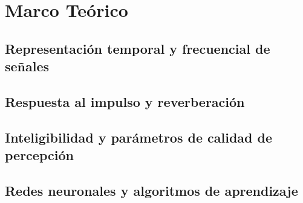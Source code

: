 \section{Marco Teórico}


\subsection{Representación temporal y frecuencial de señales}

\subsection{Respuesta al impulso y reverberación}

\subsection{Inteligibilidad y parámetros de calidad de percepción}

\subsection{Redes neuronales y algoritmos de aprendizaje}


